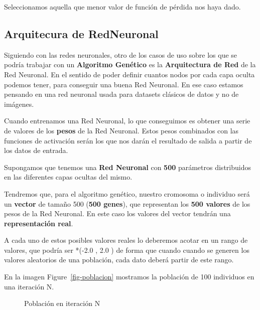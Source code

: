 \documentclass[
  a4paper,
  DIV=11,
  numbers=noendperiod]{scrreprt}
\begin{document}
Seleccionamos aquella que menor valor de función de pérdida nos haya
dado.

\subsection{Arquitecura de
RedNeuronal}\label{arquitecura-de-redneuronal}

Siguiendo con las redes neuronales, otro de los casos de uso sobre los
que se podría trabajar con un \textbf{Algoritmo Genético} es la
\textbf{Arquitectura de Red} de la Red Neuronal. En el sentido de poder
definir cuantos nodos por cada capa oculta podemos tener, para conseguir
una buena Red Neuronal. En ese caso estamos pensando en una red neuronal
usada para datasets clásicos de datos y no de imágenes.

Cuando entrenamos una Red Neuronal, lo que conseguimos es obtener una
serie de valores de los \textbf{pesos} de la Red Neuronal. Estos pesos
combinados con las funciones de activación serán los que nos darán el
resultado de salida a partir de los datos de entrada.

Supongamos que tenemos una \textbf{Red Neuronal} con \textbf{500}
parámetros distribuidos en las diferentes capas ocultas del mismo.

Tendremos que, para el algoritmo genético, nuestro cromosoma o individuo
será un \textbf{vector} de tamaño 500 (\textbf{500 genes}), que
representan los \textbf{500 valores} de los pesos de la Red Neuronal. En
este caso los valores del vector tendrán una \textbf{representación
real}.

A cada uno de estos posibles valores reales lo deberemos acotar en un
rango de valores, que podría ser *(-2.0 , 2.0 ) de forma que cuando
cuando se generen los valores aleatorios de una población, cada dato
deberá partir de este rango.

En la imagen Figure~\ref{fig-poblacion} mostramos la población de 100
individuos en una iteración N.

\begin{figure}


\caption{\label{fig-poblacion_entrenamiento_red}Población en iteración
N}

\end{figure}%
\end{document}
